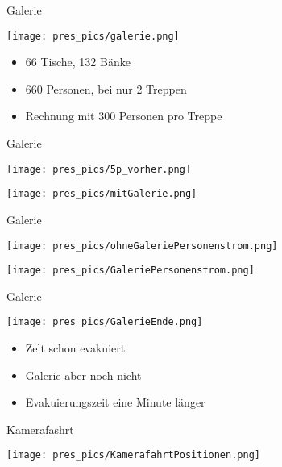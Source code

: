 \begin{frame}{Galerie}

	\texttt{[image: pres\_pics/galerie.png]}
	\begin{itemize}
		\item 66 Tische, 132 Bänke
		\item 660 Personen, bei nur 2 Treppen
		\item Rechnung mit 300 Personen pro Treppe
	\end{itemize}

\end{frame}

\begin{frame}{Galerie}

		\begin{minipage}{0.50\textwidth}
		\texttt{[image: pres\_pics/5p\_vorher.png]}
	\end{minipage} \hfill
	\begin{minipage}{0.48\textwidth}
		\texttt{[image: pres\_pics/mitGalerie.png]}
	\end{minipage}

\end{frame}

\begin{frame}{Galerie}

		\begin{minipage}{0.50\textwidth}
		\texttt{[image: pres\_pics/ohneGaleriePersonenstrom.png]}
	\end{minipage} \hfill
	\begin{minipage}{0.48\textwidth}
		\texttt{[image: pres\_pics/GaleriePersonenstrom.png]}
	\end{minipage}

\end{frame}

\begin{frame}{Galerie}

		\begin{minipage}{0.50\textwidth}
		\texttt{[image: pres\_pics/GalerieEnde.png]}
	\end{minipage} \hfill
	\begin{minipage}{0.48\textwidth}
		\begin{itemize}
			\item Zelt schon evakuiert
			\item Galerie aber noch nicht
			\item Evakuierungszeit eine Minute länger
		\end{itemize}
	\end{minipage}

\end{frame}

\begin{frame}{Kamerafashrt}


		\texttt{[image: pres\_pics/KamerafahrtPositionen.png]}


\end{frame}


